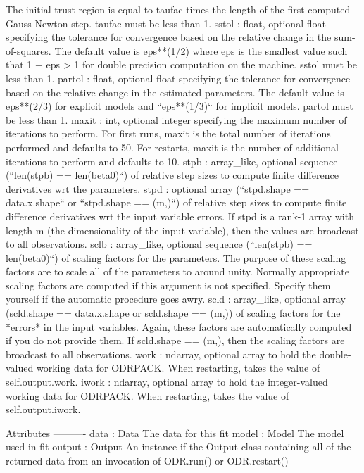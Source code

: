 \begin{DoxyVerb}
    The initial trust region is equal to taufac times the length of the
    first computed Gauss-Newton step. taufac must be less than 1.
sstol : float, optional
    float specifying the tolerance for convergence based on the relative
    change in the sum-of-squares. The default value is eps**(1/2) where eps
    is the smallest value such that 1 + eps > 1 for double precision
    computation on the machine. sstol must be less than 1.
partol : float, optional
    float specifying the tolerance for convergence based on the relative
    change in the estimated parameters. The default value is eps**(2/3) for
    explicit models and ``eps**(1/3)`` for implicit models. partol must be less
    than 1.
maxit : int, optional
    integer specifying the maximum number of iterations to perform. For
    first runs, maxit is the total number of iterations performed and
    defaults to 50.  For restarts, maxit is the number of additional
    iterations to perform and defaults to 10.
stpb : array_like, optional
    sequence (``len(stpb) == len(beta0)``) of relative step sizes to compute
    finite difference derivatives wrt the parameters.
stpd : optional
    array (``stpd.shape == data.x.shape`` or ``stpd.shape == (m,)``) of relative
    step sizes to compute finite difference derivatives wrt the input
    variable errors. If stpd is a rank-1 array with length m (the
    dimensionality of the input variable), then the values are broadcast to
    all observations.
sclb : array_like, optional
    sequence (``len(stpb) == len(beta0)``) of scaling factors for the
    parameters.  The purpose of these scaling factors are to scale all of
    the parameters to around unity. Normally appropriate scaling factors
    are computed if this argument is not specified. Specify them yourself
    if the automatic procedure goes awry.
scld : array_like, optional
    array (scld.shape == data.x.shape or scld.shape == (m,)) of scaling
    factors for the *errors* in the input variables. Again, these factors
    are automatically computed if you do not provide them. If scld.shape ==
    (m,), then the scaling factors are broadcast to all observations.
work : ndarray, optional
    array to hold the double-valued working data for ODRPACK. When
    restarting, takes the value of self.output.work.
iwork : ndarray, optional
    array to hold the integer-valued working data for ODRPACK. When
    restarting, takes the value of self.output.iwork.

Attributes
----------
data : Data
    The data for this fit
model : Model
    The model used in fit
output : Output
    An instance if the Output class containing all of the returned
    data from an invocation of ODR.run() or ODR.restart()\end{DoxyVerb}
 

